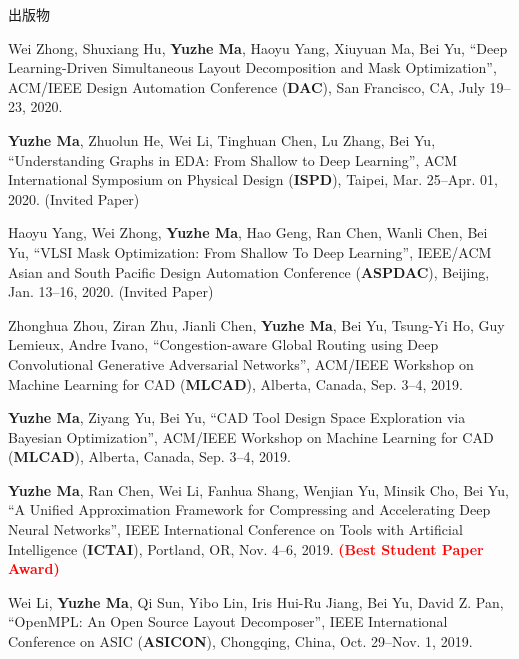 \begin{rSection}{出版物}
\begin{description}[font=\normalfont]
\item[{[C14]}]{
    Wei Zhong, Shuxiang Hu, \textbf{Yuzhe Ma}, Haoyu Yang, Xiuyuan Ma, Bei Yu,
    ``Deep Learning-Driven Simultaneous Layout Decomposition and Mask Optimization'',
    ACM/IEEE Design Automation Conference (\textbf{DAC}), San Francisco, CA, July 19–23, 2020.
}

\item[{[C13]}]{
    \textbf{Yuzhe Ma}, Zhuolun He, Wei Li, Tinghuan Chen, Lu Zhang, Bei Yu,
    ``Understanding Graphs in EDA: From Shallow to Deep Learning'',
    ACM International Symposium on Physical Design (\textbf{ISPD}), Taipei, Mar. 25–Apr. 01, 2020. (Invited Paper)
}

\item[{[C12]}]{
    Haoyu Yang, Wei Zhong, \textbf{Yuzhe Ma}, Hao Geng, Ran Chen, Wanli Chen, Bei Yu,
    ``VLSI Mask Optimization: From Shallow To Deep Learning'',
    IEEE/ACM Asian and South Pacific Design Automation Conference (\textbf{ASPDAC}), Beijing, Jan. 13--16, 2020. (Invited Paper)
}

\item[{[C11]}]{
    Zhonghua Zhou, Ziran Zhu, Jianli Chen, \textbf{Yuzhe Ma}, Bei Yu, Tsung-Yi Ho, Guy Lemieux, Andre Ivano,
    ``Congestion-aware Global Routing using Deep Convolutional Generative Adversarial Networks'',
    ACM/IEEE Workshop on Machine Learning for CAD (\textbf{MLCAD}), Alberta, Canada, Sep. 3--4, 2019.
}

\item[{[C10]}]{
    \textbf{Yuzhe Ma}, Ziyang Yu, Bei Yu,
    ``CAD Tool Design Space Exploration via Bayesian Optimization'',
    ACM/IEEE Workshop on Machine Learning for CAD (\textbf{MLCAD}), Alberta, Canada, Sep. 3--4, 2019.
}

\item[{[C9]}]{
    \textbf{Yuzhe Ma}, Ran Chen, Wei Li, Fanhua Shang, Wenjian Yu, Minsik Cho, Bei Yu,
    ``A Unified Approximation Framework for Compressing and Accelerating Deep Neural Networks'',
    IEEE International Conference on Tools with Artificial Intelligence (\textbf{ICTAI}), Portland, OR, Nov. 4--6, 2019.
    \textcolor{red}{\textbf{(Best Student Paper Award)}}
}

\item[{[C8]}]{
    Wei Li, \textbf{Yuzhe Ma}, Qi Sun, Yibo Lin, Iris Hui-Ru Jiang, Bei Yu, David Z. Pan,
    ``OpenMPL: An Open Source Layout Decomposer'',
    IEEE International Conference on ASIC (\textbf{ASICON}), Chongqing, China, Oct. 29--Nov. 1, 2019.
}


\end{description}
\end{rSection}
